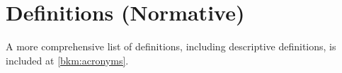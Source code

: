 %
%
\chapter{Definitions (Normative)} \label{bkm:definitionsabbreviations}

\printglossary[type=normative,style=altlist]
A more comprehensive list of definitions, including descriptive definitions, is included at \autoref{bkm:acronyms}.
